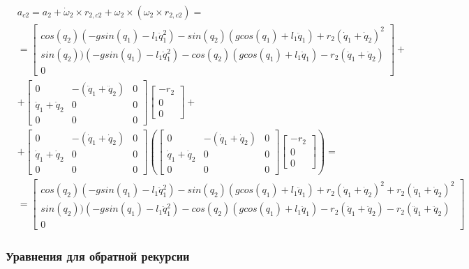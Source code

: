 \documentclass[a4paper,14pt]{extreport}
\begin{document}
\begin{itemize}
\begin{align*}
&a_{c2} = a_2 + \dot \omega_2 \times r_{2,c2} + \omega_2 \times (\omega_2 \times r_{2,c2}) =\\
&=
\begin{bmatrix}
cos(q_2) (-g sin(q_1) - l_1 \ddot q_1^2) - sin(q_2) (g cos(q_1) + l_1 \ddot q_1) + r_2 (\dot q_1 + \dot q_2)^2\\
sin(q_2) ) (-g sin(q_1) - l_1 \ddot q_1^2) - cos(q_2) (g cos(q_1) + l_1 \ddot q_1) - r_2 (\ddot q_1 + \ddot q_2)\\
0
\end{bmatrix}
+\\
&+
\begin{bmatrix}
0 & -(\ddot q_1 + \ddot q_2) & 0\\
\ddot q_1 + \ddot q_2 & 0 & 0\\
0 & 0 & 0
\end{bmatrix}
\begin{bmatrix}
-r_2\\
0\\
0
\end{bmatrix}
+\\
&+
\begin{bmatrix}
0 & -(\dot q_1 + \dot q_2) & 0\\
\dot q_1 + \dot q_2 & 0 & 0\\
0 & 0 & 0
\end{bmatrix}
\left(
\begin{bmatrix}
0 & -(\dot q_1 + \dot q_2) & 0\\
\dot q_1 + \dot q_2 & 0 & 0\\
0 & 0 & 0
\end{bmatrix}
\begin{bmatrix}
-r_2\\
0\\
0
\end{bmatrix}
\right)
=\\
&=
\begin{bmatrix}
cos(q_2) (-g sin(q_1) - l_1 \ddot q_1^2) - sin(q_2) (g cos(q_1) + l_1 \ddot q_1) + r_2 (\dot q_1 + \dot q_2)^2 + r_2(\dot q_1 + \dot q_2)^2\\
sin(q_2) ) (-g sin(q_1) - l_1 \ddot q_1^2) - cos(q_2) (g cos(q_1) + l_1 \ddot q_1) - r_2 (\ddot q_1 + \ddot q_2) - r_2(\ddot q_1 + \ddot q_2)\\
0
\end{bmatrix}
\end{align*}
\end{itemize}


\subsubsection{Уравнения для обратной рекурсии}
\end{document}
